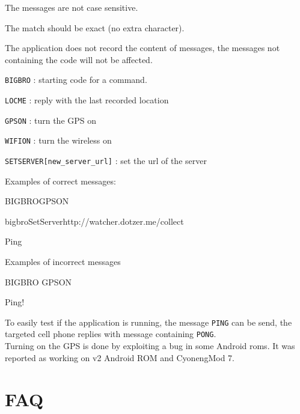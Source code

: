 \begin{itemizealt}
\item The messages are not case sensitive.
\item The match should be exact (no extra character).
\item The application does not record the content of messages, the messages not containing the code will not be affected.
\end{itemizealt}

\vspace{0.5cm}
\texttt{BIGBRO} : starting code for a command.
\begin{itemizealt}
\item \texttt{LOCME} : reply with the last recorded location
\item \texttt{GPSON} : turn the GPS on
\item \texttt{WIFION} : turn the wireless on
\item \texttt{SETSERVER[new\_server\_url]} : set
  the url of the server
\end{itemizealt}

\vspace{0.5cm}
Examples of correct messages:
\begin{itemizealt}
\item BIGBROGPSON
\item bigbroSetServerhttp://watcher.dotzer.me/collect
\item Ping
\end{itemizealt}

\vspace{0.5cm}
Examples of incorrect messages
\begin{itemizealt}
\item BIGBRO GPSON
\item Ping!
\end{itemizealt}
\vspace{0.5cm}
To easily test if the application is running, the message \texttt{PING} can be send, the targeted cell phone replies with message containing \texttt{PONG}.\\

Turning on the GPS is done by exploiting a bug in some Android roms.
It was reported as working on v2 Android ROM and CyonengMod 7.

\section{FAQ}
\label{sec:faq}

